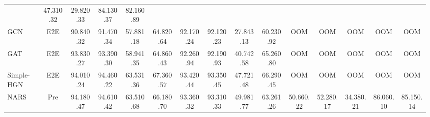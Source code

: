 \documentclass[lettersize,journal]{IEEEtran}
\begin{document}
\begin{table*}[!tp]
{\begin{tabular}{l c c c c c c c c c c c c c c}
                                                                                                                                                                               & 47.310.32  
                                                                                                                                                                                          & 29.820.33 
                                                                                                                                                                                            & 84.130.37 
                                                                                                                                                                                                & 82.160.89 \\GCN            & E2E     & 90.840.32 & 91.470.34 & 57.881.18 & 64.820.64 & 92.170.24 & 92.120.23 & 27.843.13 & 60.230.92 & OOM & OOM & OOM & OOM & OOM   \\GAT            & E2E     & 93.830.27 & 93.390.30 & 58.941.35 & 64.860.43 & 92.260.94 & 92.190.93 & 40.742.58 & 65.260.80 & OOM & OOM & OOM & OOM & OOM   \\Simple-HGN     & E2E     & 94.010.24 & 94.460.22 & 63.531.36 & 67.360.57 & 93.420.44 & 93.350.45 & 47.721.48 & 66.290.45 & OOM & OOM & OOM & OOM & OOM  \\\hline



NARS           & Pre     & 94.180.47 & 94.610.42  & 63.510.68 & 66.180.70 & 93.360.32 & 93.310.33  & 49.981.77 & 63.261.26 &50.660.22 & 52.280.17 
                                                                                                                                                                                           & 34.380.21 
                                                                                                                                                                                                 & 
                                                                                                                                                                                                
                                                                                                                                                                                                86.060.10      
                                                                                                                                                                                                             & 85.150.14\\




\end{tabular}}
\end{table*}
\end{document}
